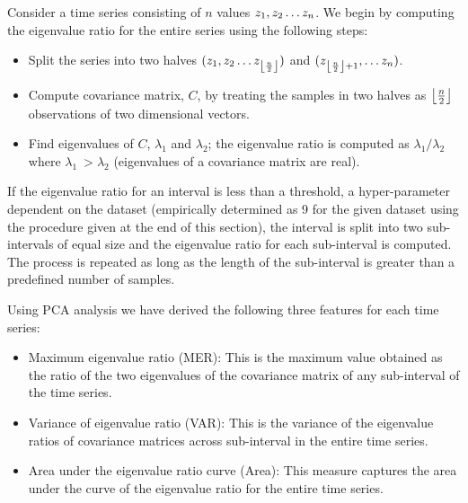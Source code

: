 \documentclass[10pt,conference]{IEEEtran}
\DeclarePairedDelimiter\floor{\lfloor}{\rfloor}
\begin{document}
Consider a time series consisting of $n$ values  $z_1, z_2 \mathellipsis z_n$. We begin by computing the eigenvalue ratio for the entire series using the following steps:
\begin{itemize}
\item  Split the series into two halves $(z_1, z_2 \mathellipsis z_{\floor*{\frac{n}{2}}})$ and $(z_{\floor*{\frac{n}{2}} + 1}, \mathellipsis z_n)$.
\item Compute covariance matrix, $C$,  by treating the samples in two halves as $\floor*{\frac{n}{2}}$ observations of two dimensional vectors.
\item Find eigenvalues of $C$, $\lambda_1$ and $\lambda_2$; the eigenvalue ratio is computed as  $\lambda_1/\lambda_2$ where $\lambda_1 \ > \lambda_2$ (eigenvalues of a covariance matrix are real).
\end{itemize}

If the eigenvalue ratio for an interval is less than a  threshold, a hyper-parameter dependent on the dataset (empirically determined as 9 for the given dataset using the procedure given at the end of this section), the interval is split into two sub-intervals of equal size and the eigenvalue ratio for each sub-interval is computed. The process is repeated as long as the length of the sub-interval is greater than a predefined number of samples.

Using PCA analysis we have derived the following three features for each time series:
\begin{itemize}
\item Maximum eigenvalue ratio (MER): This is the maximum value obtained as the ratio of the two eigenvalues of the covariance matrix of any sub-interval of the time series.
\item Variance of eigenvalue ratio (VAR): This is the variance of the eigenvalue ratios of covariance matrices across sub-interval in the entire time series.
\item Area under the eigenvalue ratio curve (Area): This measure captures the area under the curve of the eigenvalue ratio for the entire time series.
\end{itemize}
\end{document}
